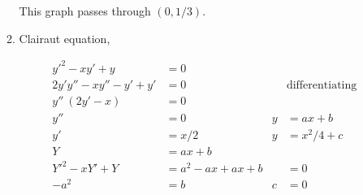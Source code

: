 \begin{enumerate}
\begin{enumerate}
                    This graph passes through $ (0, 1/3) $.
                    \begin{figure}[H]
                        \centering
                    \end{figure}

              \item Clairaut equation,

                    \begin{align}
                        y'^{2}- xy' + y       & = 0                      \\
                        2y'y'' -xy'' - y' +y' & = 0                    &
                                              & \text{differentiating}   \\
                        y''\ (2y' - x)        & = 0                      \\
                        y''                   & = 0                    &
                        y                     & = ax + b                 \\
                        y'                    & = x/2                  &
                        y                     & = x^{2}/4 + c            \\
                        Y                     & = ax + b                 \\
                        Y'^{2}- xY' + Y       & =a^{2} - ax + ax + b   &
                                              & = 0                      \\
                        -a^{2}                & = b                    &
                        c                     & = 0
                    \end{align}


\end{enumerate}
\end{enumerate}
